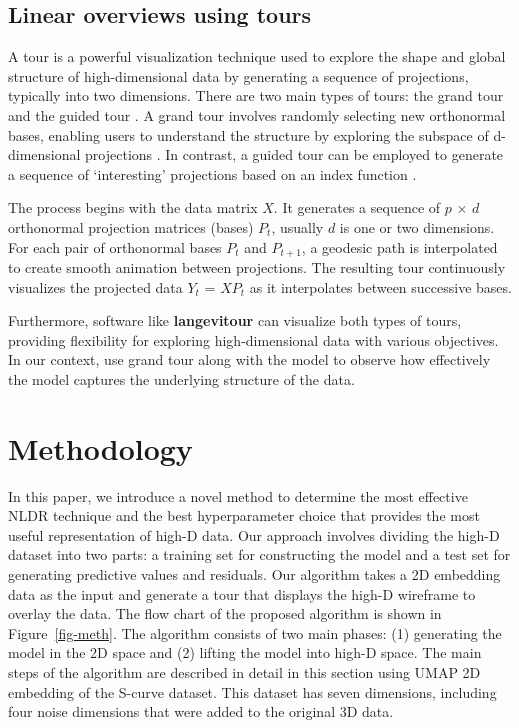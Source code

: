 \documentclass[
  12pt]{article}
\begin{document}
\subsection{Linear overviews using
tours}\label{linear-overviews-using-tours}

A tour is a powerful visualization technique used to explore the shape
and global structure of high-dimensional data by generating a sequence
of projections, typically into two dimensions. There are two main types
of tours: the grand tour \citep{Asimov1985} and the guided tour
\citep{article29}. A grand tour involves randomly selecting new
orthonormal bases, enabling users to understand the structure by
exploring the subspace of d-dimensional projections \citep{Asimov1985}.
In contrast, a guided tour can be employed to generate a sequence of
`interesting' projections based on an index function \citep{article29}.

The process begins with the data matrix \(X\). It generates a sequence
of \(p\) × \(d\) orthonormal projection matrices (bases) \(P_t\),
usually \(d\) is one or two dimensions. For each pair of orthonormal
bases \(P_t\) and \(P_{t+1}\), a geodesic path is interpolated to create
smooth animation between projections. The resulting tour continuously
visualizes the projected data \(Y_t\) = \(XP_t\) as it interpolates
between successive bases.

Furthermore, software like \textbf{langevitour} can visualize both types
of tours, providing flexibility for exploring high-dimensional data with
various objectives. In our context, use grand tour along with the model
to observe how effectively the model captures the underlying structure
of the data.

\section{Methodology}\label{sec-methods}

In this paper, we introduce a novel method to determine the most
effective NLDR technique and the best hyperparameter choice that
provides the most useful representation of high-D data. Our approach
involves dividing the high-D dataset into two parts: a training set for
constructing the model and a test set for generating predictive values
and residuals. Our algorithm takes a 2D embedding data as the input and
generate a tour that displays the high-D wireframe to overlay the data.
The flow chart of the proposed algorithm is shown in
Figure~\ref{fig-meth}. The algorithm consists of two main phases: (1)
generating the model in the 2D space and (2) lifting the model into
high-D space. The main steps of the algorithm are described in detail in
this section using UMAP 2D embedding of the S-curve dataset. This
dataset has seven dimensions, including four noise dimensions that were
added to the original 3D data.
\end{document}
